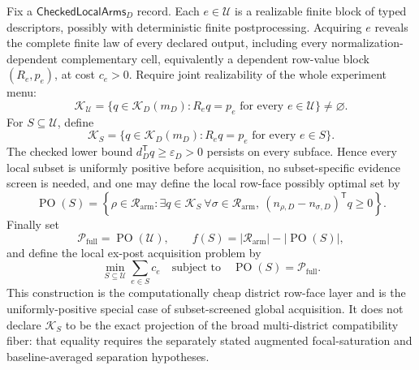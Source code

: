 Fix a \(\mathsf{CheckedLocalArms}_D\) record.  Each \(e\in\mathcal U\) is a realizable finite block of typed descriptors, possibly with deterministic finite postprocessing.  Acquiring \(e\) reveals the complete finite law of every declared output, including every normalization-dependent complementary cell, equivalently a dependent row-value block \((R_e,p_e)\), at cost \(c_e>0\).  Require joint realizability of the whole experiment menu:
\[
\mathcal K_{\mathcal U}
=\{q\in\mathcal K_D(m_D):R_eq=p_e\text{ for every }e\in\mathcal U\}
\ne\varnothing.
\]
For \(S\subseteq\mathcal U\), define
\[
\mathcal K_S
=\{q\in\mathcal K_D(m_D):R_eq=p_e\text{ for every }e\in S\}.
\]
The checked lower bound \(d_D^{\mathsf T}q\geq\varepsilon_D>0\) persists on every subface.  Hence every local subset is uniformly positive before acquisition, no subset-specific evidence screen is needed, and one may define the local row-face possibly optimal set by
\[
\operatorname{PO}(S)
=\left\{\rho\in\mathcal R_{\mathrm{arm}}:
\exists q\in\mathcal K_S\ \forall\sigma\in\mathcal R_{\mathrm{arm}},\ 
(n_{\rho,D}-n_{\sigma,D})^{\mathsf T}q\geq0\right\}.
\]
Finally set
\[
\mathcal P_{\mathrm{full}}=\operatorname{PO}(\mathcal U),
\qquad
f(S)=|\mathcal R_{\mathrm{arm}}|-|\operatorname{PO}(S)|,
\]
and define the local ex-post acquisition problem by
\[
\min_{S\subseteq\mathcal U}\sum_{e\in S}c_e
\quad\text{subject to}\quad
\operatorname{PO}(S)=\mathcal P_{\mathrm{full}}.
\]
This construction is the computationally cheap district row-face layer and is the uniformly-positive special case of subset-screened global acquisition.  It does not declare \(\mathcal K_S\) to be the exact projection of the broad multi-district compatibility fiber: that equality requires the separately stated augmented focal-saturation and baseline-averaged separation hypotheses.